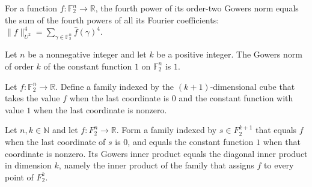 \begin{theorem}
\label{FABL.gowersNorm_two_pow_four_eq}
\leanok
{}
For a function $f:\mathbb{F}_2^n\to\mathbb{R}$, the fourth power of its order-two Gowers
norm equals the sum of the fourth powers of all its Fourier coefficients:
$\|f\|_{U^2}^4=\sum_{\gamma\in\mathbb{F}_2^n}\widehat f(\gamma)^4$.
\end{theorem}

\begin{theorem}
\label{FABL.gowersNorm_one}
\leanok
{}
Let $n$ be a nonnegative integer and let $k$ be a positive integer. The Gowers norm of
order $k$ of the constant function $1$ on $\mathbb F_2^n$ is $1$.
\end{theorem}

\begin{definition}
\label{FABL.gowersMonotonicityFamily}
\leanok
{}
Let $f:\mathbb F_2^n\to\mathbb R$. Define a family indexed by the $(k+1)$-dimensional
cube that takes the value $f$ when the last coordinate is $0$ and the constant function
with value $1$ when the last coordinate is nonzero.
\end{definition}

\begin{theorem}
\label{FABL.gowersInner_monotonicityFamily}
\leanok
{}
Let $n,k\in\mathbb N$ and let $f:F_2^n\to\mathbb R$. Form a family indexed by $s\in
F_2^{k+1}$ that equals $f$ when the last coordinate of $s$ is $0$, and equals the
constant function $1$ when that coordinate is nonzero. Its Gowers inner product equals
the diagonal inner product in dimension $k$, namely the inner product of the family that
assigns $f$ to every point of $F_2^k$.
\end{theorem}

